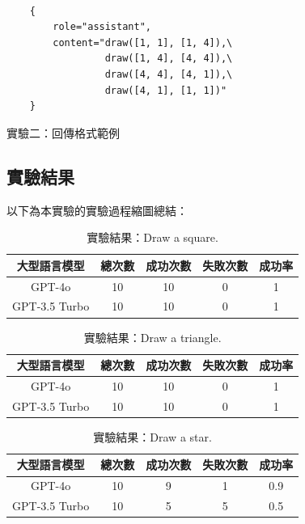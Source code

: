 \documentclass[class=NCU_thesis, crop=false]{standalone}
\begin{document}
\begin{listing}
    \begin{verbatim}

    {
        role="assistant",
        content="draw([1, 1], [1, 4]),\
                 draw([1, 4], [4, 4]),\
                 draw([4, 4], [4, 1]),\
                 draw([4, 1], [1, 1])"
    }

    \end{verbatim}
\caption{實驗二：回傳格式範例} 
\end{listing}

\subsection{實驗結果}
以下為本實驗的實驗過程縮圖總結：\\


\begin{table}[h]
    \centering
    \caption{實驗結果：Draw a square.}
    \begin{tabular}{ccccc}
    \hline
    大型語言模型 & 總次數 & 成功次數 & 失敗次數 & 成功率 \\
    \hline
    GPT-4o & 10 & 10 & 0 & 1\\
    \hline
    GPT-3.5 Turbo & 10 & 10 & 0 & 1\\
    \hline
    \end{tabular}
\end{table}

\begin{table}[h]
    \centering
    \caption{實驗結果：Draw a triangle.}
    \begin{tabular}{ccccc}
    \hline
    大型語言模型 & 總次數 & 成功次數 & 失敗次數 & 成功率 \\
    \hline
    GPT-4o & 10 & 10 & 0 & 1\\
    \hline
    GPT-3.5 Turbo & 10 & 10 & 0 & 1\\
    \hline
    \end{tabular}
\end{table}

\begin{table}[h]
    \centering
    \caption{實驗結果：Draw a star.}
    \begin{tabular}{ccccc}
    \hline
    大型語言模型 & 總次數 & 成功次數 & 失敗次數 & 成功率 \\
    \hline
    GPT-4o & 10 & 9 & 1 & 0.9\\
    \hline
    GPT-3.5 Turbo & 10 & 5 & 5 & 0.5\\
    \hline
    \end{tabular}
\end{table}
\end{document}
